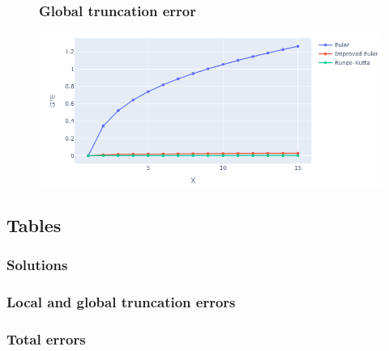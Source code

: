 \documentclass[12pt,letterpaper]{article}
\begin{document}
\begin{figure}[!h]
    \begin{center}
        \subsubsection*{Global truncation error}
    \end{center}
    \centering
        \includegraphics[width=1\linewidth]{gte.png}
\end{figure}


\clearpage


\begin{center}
\subsection*{Tables}
\subsubsection*{Solutions}
\end{center}


\begin{center}
\subsubsection*{Local and global truncation errors}

\end{center}

\begin{center}
\subsubsection*{Total errors}

\end{center}
\end{document}
